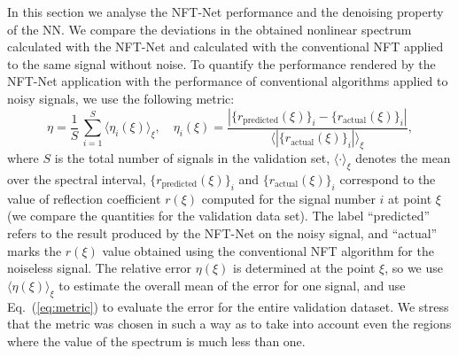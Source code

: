 In this section we analyse the NFT-Net performance and the denoising property of the NN. We compare the deviations in the obtained nonlinear spectrum calculated with the NFT-Net and calculated with the conventional NFT applied to the same signal without noise. To quantify the performance rendered by the NFT-Net application with the performance of conventional algorithms applied to noisy signals, we use the following metric:
\begin{equation}
    \eta = \frac{1}{S} \, \sum_{i = 1}^{S} \langle \eta_i(\xi) \rangle_{\xi},
    \quad
    \eta_i(\xi) = \frac{|\{r_\text{predicted}(\xi)\}_i - \{r_\text{actual}(\xi)\}_i| }{\langle |\{r_\text{actual}(\xi)\}_i| \rangle_{\xi}} {,}
    \label{eq:metric}
\end{equation}
where $S$ is the total number of signals in the validation set, $\langle \cdot \rangle_{\xi}$ denotes the mean over the spectral interval, 
$\{r_{\text{predicted}}(\xi)\}_{i}$ and $\{r_{\text{actual}}(\xi)\}_{i}$ correspond to the value of reflection coefficient $r(\xi)$ computed for the signal number $i$ at point $\xi$ (we compare the quantities for the validation data set).  The label ``predicted'' refers to the result produced by the NFT-Net on the noisy signal, and ``actual'' marks the $r(\xi)$ value obtained using the conventional NFT algorithm\cite{FNFT2018} for the noiseless signal.
The relative error $\eta(\xi)$ is determined at the point $\xi$, so we use $\langle \eta(\xi) \rangle_{\xi}$ to estimate the overall mean of the error for one signal, and use Eq.~(\ref{eq:metric})  to evaluate the error for the entire validation dataset.
We stress that the metric was chosen in such a way as to take into account even the regions where the value of the spectrum is much less than one.


